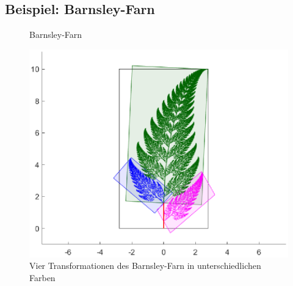\subsection{Beispiel: Barnsley-Farn}
\begin{figure}	
	\centering
	\caption{Barnsley-Farn}
	\label{ifs:farn}
\end{figure}%
\begin{figure}
	\centering
	\includegraphics[width=\textwidth]{papers/ifs/images/farncolor2}
	\caption{Vier Transformationen des Barnsley-Farn in unterschiedlichen Farben}
	\label{ifs:farncolor}
\end{figure}%
